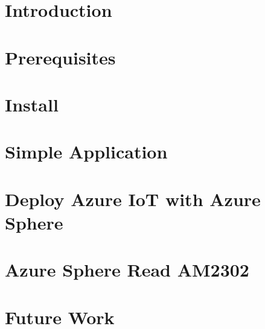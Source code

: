 \section{Introduction}

\newpage

\section{Prerequisites}

\newpage

\section{Install}

\newpage

\section{Simple Application}
\label{sec:sim_app}

\newpage

\section{Deploy Azure IoT with Azure Sphere}

\newpage

\section{Azure Sphere Read AM2302}


\section{Future Work}

\newpage
